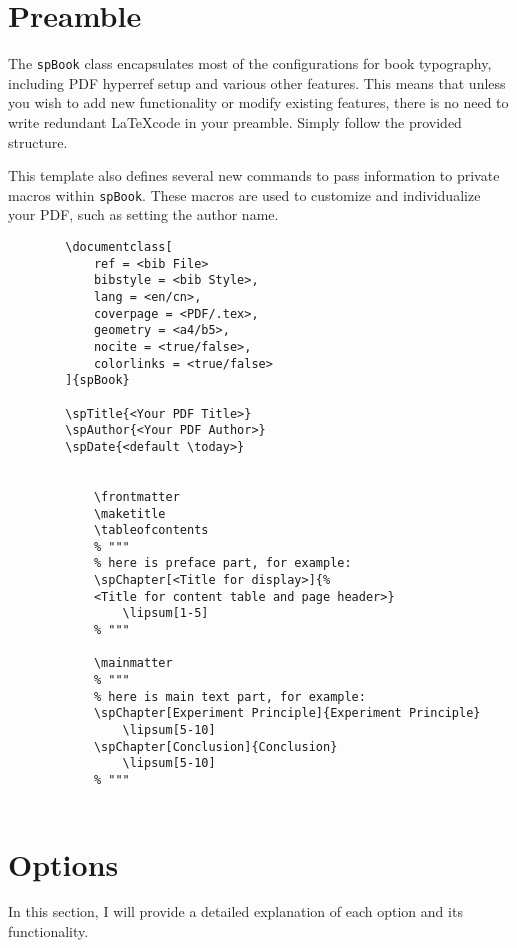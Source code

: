 
\section{Preamble}
    The \texttt{spBook} class encapsulates most of the configurations for book typography, including PDF hyperref setup and various other features. This means that unless you wish to add new functionality or modify existing features, there is no need to write redundant \LaTeX code in your preamble. Simply follow the provided structure.

    This template also defines several new commands to pass information to private macros within \texttt{spBook}. These macros are used to customize and individualize your PDF, such as setting the author name.

    \begin{Verbatim}
        \documentclass[
            ref = <bib File>
            bibstyle = <bib Style>,
            lang = <en/cn>,
            coverpage = <PDF/.tex>,
            geometry = <a4/b5>,
            nocite = <true/false>,
            colorlinks = <true/false>
        ]{spBook}

        \spTitle{<Your PDF Title>}
        \spAuthor{<Your PDF Author>}
        \spDate{<default \today>}

        
            \frontmatter
            \maketitle
            \tableofcontents
            % """
            % here is preface part, for example:
            \spChapter[<Title for display>]{%
            <Title for content table and page header>}
                \lipsum[1-5]
            % """

            \mainmatter
            % """
            % here is main text part, for example:
            \spChapter[Experiment Principle]{Experiment Principle}
                \lipsum[5-10]
            \spChapter[Conclusion]{Conclusion}
                \lipsum[5-10]
            % """
        
    \end{Verbatim}

\section{Options}
    In this section, I will provide a detailed explanation of each option and its functionality.

